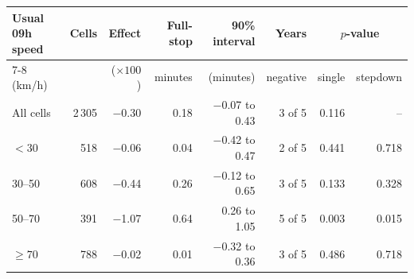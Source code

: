 \begin{tabular}{lrrrrrrr}
\toprule
Usual 09h speed & Cells & Effect & Full-stop & 90\% interval & Years & \multicolumn{2}{c}{$p$-value} \\
\cmidrule(lr){7-8}
(km/h) & & ($\times 100$) & minutes & (minutes) & negative & single & stepdown \\
\midrule
All cells & 2\,305 & \ensuremath{-}0.30 & 0.18 & \ensuremath{-}0.07 to 0.43 & 3 of 5 & 0.116 & -- \\
\addlinespace
$<30$ & 518 & \ensuremath{-}0.06 & 0.04 & \ensuremath{-}0.42 to 0.47 & 2 of 5 & 0.441 & 0.718 \\
30--50 & 608 & \ensuremath{-}0.44 & 0.26 & \ensuremath{-}0.12 to 0.65 & 3 of 5 & 0.133 & 0.328 \\
50--70 & 391 & \ensuremath{-}1.07 & 0.64 & 0.26 to 1.05 & 5 of 5 & 0.003 & 0.015 \\
$\geq 70$ & 788 & \ensuremath{-}0.02 & 0.01 & \ensuremath{-}0.32 to 0.36 & 3 of 5 & 0.486 & 0.718 \\
\bottomrule
\end{tabular}
